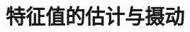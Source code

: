 \documentclass[12pt, a4paper, oneside, UTF8]{ctexbook}
\begin{document}
\else
\fi
\chapter{特征值的估计与摄动}

\ifx\allfiles\undefined
\end{document}
